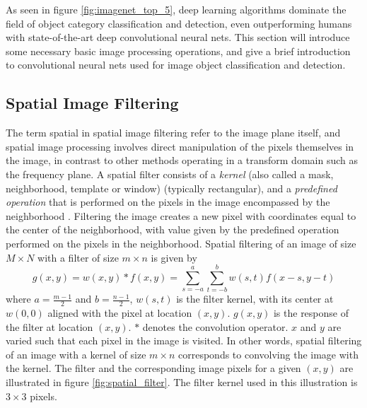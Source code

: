 As seen in figure \ref{fig:imagenet_top_5}, deep learning algorithms dominate the field of object category classification and detection, even outperforming humans with state-of-the-art deep convolutional neural nets. This section will introduce some necessary basic image processing operations, and give a brief introduction to convolutional neural nets used for image object classification and detection.
\subsection{Spatial Image Filtering}
The term spatial in spatial image filtering refer to the image plane itself, and spatial image processing involves direct manipulation of the pixels themselves in the image, in contrast to other methods operating in a transform domain such as the frequency plane. A spatial filter consists of a \textit{kernel} (also called a mask, neighborhood, template or window) (typically rectangular), and a \textit{predefined operation} that is performed on the pixels in the image encompassed by the neighborhood \cite{digImage}. Filtering the image creates a new pixel with coordinates equal to the center of the neighborhood, with value given by the predefined operation performed on the pixels in the neighborhood. Spatial filtering of an image of size $M\times N$ with a filter of size $m\times n$ is given by
\begin{equation}
\label{eq:spatial_filt}
    g(x,y)=w(x,y)*f(x,y)=\sum^{a}_{s=-a}\sum^{b}_{t=-b}w(s,t)f(x-s,y-t)
\end{equation}
where $a=\frac{m-1}{2}$ and $b=\frac{n-1}{2}$, $w(s,t)$ is the filter kernel, with its center at $w(0,0)$ aligned with the pixel at location $(x,y)$. $g(x,y)$ is the response of the filter at location $(x,y)$. $*$ denotes the convolution operator. $x$ and $y$ are varied such that each pixel in the image is visited. In other words, spatial filtering of an image with a kernel of size $m\times n$ corresponds to convolving the image with the kernel. The filter and the corresponding image pixels for a given $(x,y)$ are illustrated in figure \ref{fig:spatial_filter}. The filter kernel used in this illustration is $3\times3$ pixels.
